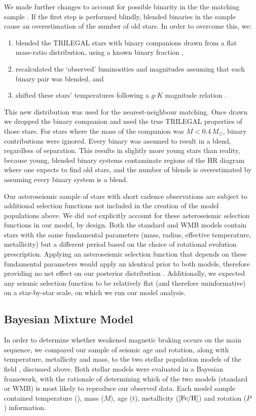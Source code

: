 We made further changes to account for possible binarity in the the matching sample \cite{m_berger+2020}. If the first step is performed blindly, blended binaries in the sample cause an overestimation of the number of old stars. In order to overcome this, we:

\begin{enumerate}
	\item blended the TRILEGAL stars with binary companions drawn from a flat mass-ratio distribution, using a known binary fraction \cite{m_raghavan+2010},
	\item recalculated the `observed' luminosities and magnitudes assuming that each binary pair was blended, and
	\item shifted these stars' temperatures following a $g$-$K$ magnitude relation \cite{m_berger+2020}.
\end{enumerate}

This new distribution was used for the nearest-neighbour matching. Once drawn we dropped the binary companion and used the true TRILEGAL properties of those stars. For stars where the mass of the companion was $M < 0.4\, M_\odot$, binary contributions were ignored. Every binary was assumed to result in a blend, regardless of separation. This results in slightly more young stars than reality, because young, blended binary systems contaminate regions of the HR diagram where one expects to find old stars, and the number of blends is overestimated by assuming every binary system is a blend.

Our asteroseismic sample of stars with short cadence observations are subject to additional selection functions not included in the creation of the model populations above. We did \textit{not} explicitly account for these asteroseismic selection functions in our model, by design. Both the standard and WMB models contain stars with the same fundamental parameters (mass, radius, effective temperature, metallicity) but a different period based on the choice of rotational evolution prescription. Applying an asteroseismic selection function that depends on these fundamental parameters would apply an identical prior to both models, therefore providing no net effect on our posterior distribution \cite{m_chaplin+2011}.  Additionally, we expected any seismic selection function to be relatively flat (and therefore uninformative) on a star-by-star scale, on which we run our model analysis. 

\subsection{Bayesian Mixture Model}
In order to determine whether weakened magnetic braking occurs on the main sequence, we compared our sample of seismic age and rotation, along with temperature, metallicity and mass, to the two stellar population models of the \kepler field \cite{m_vansaders+2019}, discussed above. Both stellar models were evaluated in a Bayesian framework, with the rationale of determining which of the two models (standard or WMB) is most likely to reproduce our observed data. Each model sample contained temperature (\teff), mass ($M$), age ($t$), metallicity ($\rm{[Fe/H]}$) and rotation ($P$) information.

